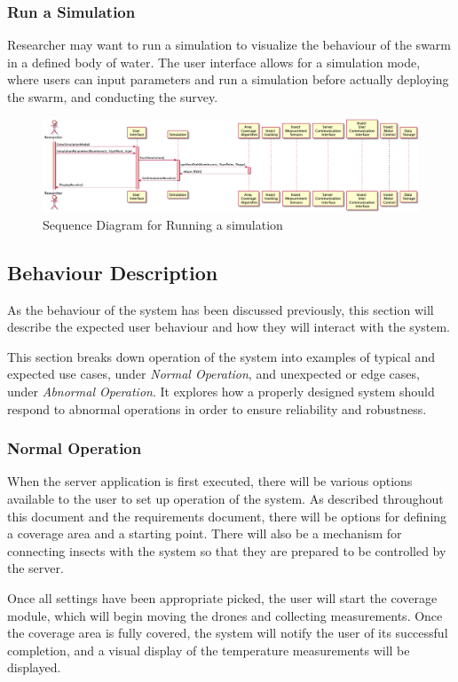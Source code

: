 \documentclass[11pt]{article}
\begin{document}
\subsubsection{Run a Simulation}
Researcher may want to run a simulation to visualize the behaviour of the swarm in a defined body of water. The user interface allows for a simulation mode, where users can input parameters and run a simulation before actually deploying the swarm, and conducting the survey.
\begin{figure}[H]
   \centering
   \includegraphics[width=\textwidth]{diagram/sequence.png}
   \caption{Sequence Diagram for Running a simulation}
   \label{fig:stop}
\end{figure}


\subsection{Behaviour Description}
As the behaviour of the system has been discussed previously, this section will describe the expected user behaviour and how they will interact with the system.

This section breaks down operation of the system into examples of typical and expected use cases, under \textit{Normal Operation}, and
unexpected or edge cases, under \textit{Abnormal Operation}. It explores how a properly designed system should respond to abnormal operations
in order to ensure reliability and robustness.

\subsubsection{Normal Operation}
When the server application is first executed, there will be various options available to the user to set up operation of the system. As described
throughout this document and the requirements document, there will be options for defining a coverage area and a starting point. There will also
be a mechanism for connecting insects with the system so that they are prepared to be controlled by the server.

Once all settings have been appropriate picked, the user will start the coverage module, which will begin moving the drones and collecting
measurements. Once the coverage area is fully covered, the system will notify the user of its successful completion, and a visual display of the
temperature measurements will be displayed.
\end{document}

